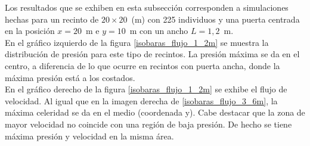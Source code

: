 Los resultados que se exhiben en esta subsección corresponden a simulaciones hechas para un recinto de  $20\times 20$~(m) con 225 individuos y una puerta centrada en la posición $x=20$~m e $y=10$~m con un ancho $L=1,2$~m.\\
En el gráfico izquierdo de la figura \ref{isobaras_flujo_1_2m} se muestra la distribución de presión para este tipo de recintos. La presión máxima se da en el centro, a diferencia de lo que ocurre en recintos con puerta ancha, donde la máxima presión está a los costados.\\
En el gráfico derecho de la figura \ref{isobaras_flujo_1_2m} se exhibe el flujo de velocidad. Al igual que en la imagen derecha de  \ref{isobaras_flujo_3_6m}, la máxima celeridad se da en el medio (coordenada y).
Cabe destacar que la zona de mayor velocidad no coincide con una región de baja presión. De hecho se tiene máxima presión y velocidad en la misma área.  

